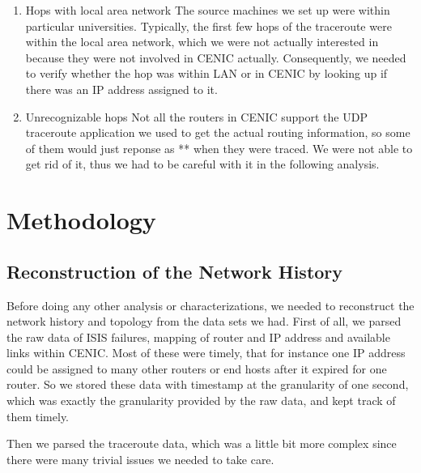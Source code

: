 \documentclass[conference, twocolumn, oneside, 10pt]{IEEEtran}
\begin{document}
\begin{enumerate}

\item{Hops with local area network} The source machines we set up were within particular universities. Typically, the first few hops of the traceroute were within the local area network, which we were not actually interested in because they were not involved in CENIC actually. Consequently, we needed to verify whether the hop was within LAN or in CENIC by looking up if there was an IP address assigned to it.

\item{Unrecognizable hops} Not all the routers in CENIC support the UDP traceroute application we used to get the actual routing information, so some of them would just reponse as ** when they were traced. We were not able to get rid of it, thus we had to be careful with it in the following analysis.

\end{enumerate}

\section{Methodology}
\label{sec:sec4}

\subsection{Reconstruction of the Network History}

Before doing any other analysis or characterizations, we needed to reconstruct the network history and topology from the data sets we had. First of all, we parsed the raw data of ISIS failures, mapping of router and IP address and available links within CENIC. Most of these were timely, that for instance one IP address could be assigned to many other routers or end hosts after it expired for one router. So we stored these data with timestamp at the granularity of one second, which was exactly the granularity provided by the raw data, and kept track of them timely.

Then we parsed the traceroute data, which was a little bit more complex since there were many trivial issues we needed to take care.
\end{document}
